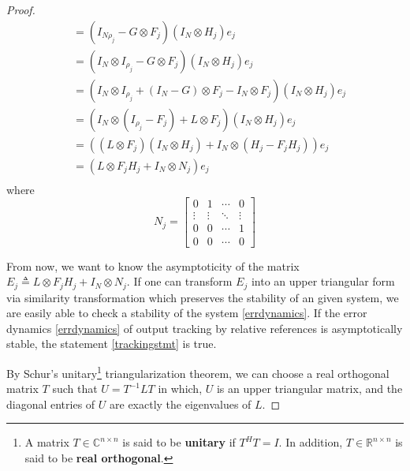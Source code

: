 \documentclass[11pt, a4paper, oneside, openany, reqno]{book}
\theoremstyle{definition}
\theoremstyle{remark}
\numberwithin{equation}{chapter} %
\newcommand{\R}{\ensuremath{{\mathbb R}}}
\newcommand{\C}{\ensuremath{{\mathbb C}}}
\begin{document}
\begin{proof}
\begin{equation}
\begin{split}
	&= (I_{N\rho_j}-G \otimes F_j )(I_N \otimes H_j ) e_j  \\
	&= (I_N \otimes I_{\rho_j} -G \otimes F_j )(I_N \otimes H_j ) e_j  \\
	&= (I_N \otimes I_{\rho_j} +(I_N-G) \otimes F_j  - I_N \otimes F_j )(I_N \otimes H_j ) e_j  \\
	&= (I_N \otimes (I_{\rho_j} -F_j ) +L \otimes F_j  )(I_N \otimes H_j ) e_j  \\
	&= ( (L \otimes F_j )(I_N \otimes H_j ) + I_N \otimes (H_j -F_j H_j ) ) e_j\\	
	&= ( L \otimes F_j H_j  + I_N \otimes N_j  ) e_j \\	
	\end{split}\end{equation}
	where
	\begin{equation}
	N_j  = \left[ \begin{array}{cccc } 
		0 & 1 & \cdots & 0\\
		\vdots & \vdots & \ddots & \vdots\\
		0 & 0 & \cdots & 1\\
		0 & 0 & \cdots & 0	
		\end{array} \right] %
	\end{equation}
	
	From now, we want to know the asymptoticity of the matrix 
	$ E_j  \triangleq L \otimes F_j H_j  + I_N \otimes N_j  $.
	If one can transform $ E_j $ into an upper triangular form via similarity transformation
	which preserves the stability of an given system,
	we are easily able to check a stability of the system \eqref{errdynamics}.	
	If the error dynamics \eqref{errdynamics} of output tracking by relative references 
	is asymptotically stable, the statement \eqref{trackingstmt} is true.
	
	By Schur's unitary\footnote{A matrix $ T \in \C^{n \times n} $ is said to be \textbf{unitary}
	if $ T^H T=I $. In addition, $ T \in \R^{n \times n} $ is said to be \textbf{real orthogonal}. }
	triangularization theorem\cite{horn}, 
	we can choose a real orthogonal matrix $ T $ such that $ U=T^{-1}LT $ 
	in which, $ U $ is an upper triangular matrix, 
	and	the diagonal entries of $ U $ are exactly the eigenvalues of $ L $.
	

\end{proof}
\end{document}
